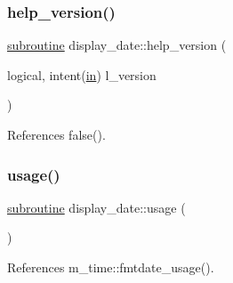 \mbox{\label{now_8f90_a52114522a23078dbabe7b35ced8a9ae5}} 
\subsubsection{\texorpdfstring{help\+\_\+version()}{help\_version()}}
{\footnotesize\ttfamily \hyperlink{M__stopwatch_83_8txt_acfbcff50169d691ff02d4a123ed70482}{subroutine} display\+\_\+date\+::help\+\_\+version (\begin{DoxyParamCaption}\item[{logical, intent(\hyperlink{M__journal_83_8txt_afce72651d1eed785a2132bee863b2f38}{in})}]{l\+\_\+version }\end{DoxyParamCaption})}



References false().

\mbox{\label{now_8f90_a2f52503ff8f83f2a588647231e597e58}} 
\subsubsection{\texorpdfstring{usage()}{usage()}}
{\footnotesize\ttfamily \hyperlink{M__stopwatch_83_8txt_acfbcff50169d691ff02d4a123ed70482}{subroutine} display\+\_\+date\+::usage (\begin{DoxyParamCaption}{ }\end{DoxyParamCaption})}



References m\+\_\+time\+::fmtdate\+\_\+usage().

